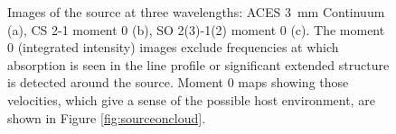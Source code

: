 \documentclass[]{aastex631}
\newcommand{\threemm}{3~mm\xspace}
\begin{document}
\begin{figure}
    \centering
    
    \caption{Images of the source at three wavelengths: ACES \threemm Continuum (a), CS 2-1 moment 0 (b), SO 2(3)-1(2) moment 0 (c).  The moment 0 (integrated intensity) images exclude frequencies at which absorption is seen in the line profile or significant extended structure is detected around the source.  Moment 0 maps showing those velocities, which give a sense of the possible host environment, are shown in Figure \ref{fig:sourceoncloud}.}
    \label{fig:continuumandmom0}
\end{figure}
\end{document}
